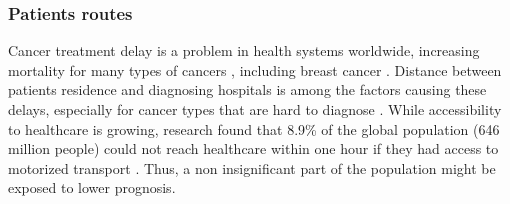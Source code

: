 \subsubsection{Patients routes}

Cancer treatment delay is a problem in health systems worldwide, increasing
mortality for many types of cancers \cite{hanna_mortality_2020}, including
breast cancer \cite{caplan_delay_1992, williams_assessment_2015,
    pace_delays_2015}. Distance between patients residence and diagnosing hospitals
is among the factors causing these delays, especially for cancer types that are
hard to diagnose \cite{flytkjaer_virgilsen_cancer_2019}. While accessibility to
healthcare is growing, research found that 8.9\% of the global population (646
million people) could not reach healthcare within one hour if they had access to
motorized transport \cite{weiss_global_2020}. Thus, a non insignificant part of
the population might be exposed to lower prognosis.

